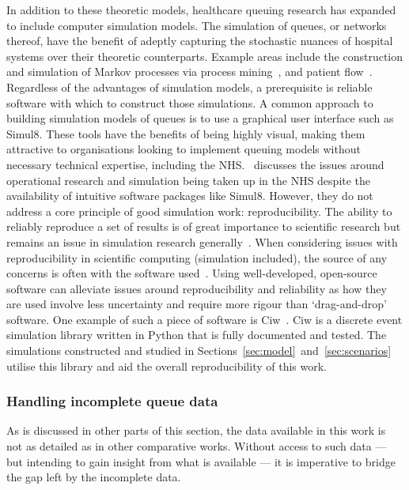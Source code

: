 In addition to these theoretic models, healthcare queuing research has expanded
to include computer simulation models. The simulation of queues, or networks
thereof, have the benefit of adeptly capturing the stochastic nuances of
hospital systems over their theoretic counterparts. Example areas include the
construction and simulation of Markov processes via process
mining~\cite{Arnolds2018,Rebuge2012}, and patient flow~\cite{Bhattacharjee2014}.
Regardless of the advantages of simulation models, a prerequisite is reliable
software with which to construct those simulations. A common approach to
building simulation models of queues is to use a graphical user interface such
as Simul8. These tools have the benefits of being highly visual, making them
attractive to organisations looking to implement queuing models without
necessary technical expertise, including the NHS.~\cite{Brailsford2013}
discusses the issues around operational research and simulation being taken up
in the NHS despite the availability of intuitive software packages like Simul8.
However, they do not address a core principle of good simulation work:
reproducibility. The ability to reliably reproduce a set of results is of great
importance to scientific research but remains an issue in simulation research
generally~\cite{Fitzpatrick2019}. When considering issues with reproducibility
in scientific computing (simulation included), the source of any concerns is
often with the software used~\cite{Ivie2018}. Using well-developed, open-source
software can alleviate issues around reproducibility and reliability as how they
are used involve less uncertainty and require more rigour than ‘drag-and-drop’
software. One example of such a piece of software is Ciw~\cite{Palmer2019}. Ciw
is a discrete event simulation library written in Python that is fully
documented and tested. The simulations constructed and studied in
Sections~\ref{sec:model}~and~\ref{sec:scenarios} utilise this library and aid
the overall reproducibility of this work.

\subsubsection{Handling incomplete queue data}

As is discussed in other parts of this section, the data available in this work
is not as detailed as in other comparative works. Without access to such data
--- but intending to gain insight from what is available --- it is
imperative to bridge the gap left by the incomplete data.

